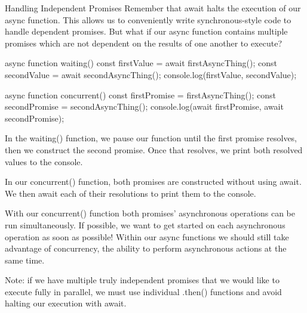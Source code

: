 Handling Independent Promises
    Remember that await halts the execution of our async function. This allows us to conveniently write synchronous-style code to handle dependent promises. But what if our async function contains multiple promises which are not dependent on the results of one another to execute?

        async function waiting() {
        const firstValue = await firstAsyncThing();
        const secondValue = await secondAsyncThing();
        console.log(firstValue, secondValue);
        }

        async function concurrent() {
        const firstPromise = firstAsyncThing();
        const secondPromise = secondAsyncThing();
        console.log(await firstPromise, await secondPromise);
        }

    In the waiting() function, we pause our function until the first promise resolves, then we construct the second promise. Once that resolves, we print both resolved values to the console.

    In our concurrent() function, both promises are constructed without using await. We then await each of their resolutions to print them to the console.

    With our concurrent() function both promises’ asynchronous operations can be run simultaneously. If possible, we want to get started on each asynchronous operation as soon as possible! Within our async functions we should still take advantage of concurrency, the ability to perform asynchronous actions at the same time.

    Note: if we have multiple truly independent promises that we would like to execute fully in parallel, we must use individual .then() functions and avoid halting our execution with await.